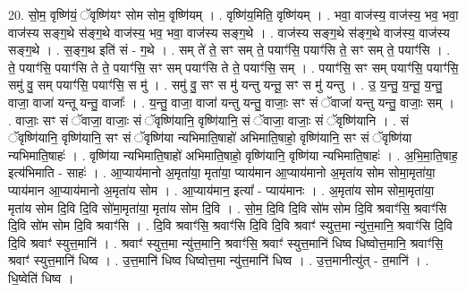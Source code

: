 \documentclass[17pt]{extarticle}
\begin{document}
20. सो॒म॒ वृष्णि॑यं॒ ॅवृष्णि॑यꣳ सोम सोम॒ वृष्णि॑यम् । . वृष्णि॑य॒मिति॒ वृष्णि॑यम् । . भवा॒ वाज॑स्य॒ वाज॑स्य॒ भव॒ भवा॒ वाज॑स्य सङ्ग॒थे स॑ङ्ग॒थे वाज॑स्य॒ भव॒ भवा॒ वाज॑स्य सङ्ग॒थे । . वाज॑स्य सङ्ग॒थे स॑ङ्ग॒थे वाज॑स्य॒ वाज॑स्य सङ्ग॒थे । . स॒ङ्ग॒थ इति॑ सं - ग॒थे । . सम् ते॑ ते॒ सꣳ सम् ते॒ पयाꣳ॑सि॒ पयाꣳ॑सि ते॒ सꣳ सम् ते॒ पयाꣳ॑सि । . ते॒ पयाꣳ॑सि॒ पयाꣳ॑सि ते ते॒ पयाꣳ॑सि॒ सꣳ सम् पयाꣳ॑सि ते ते॒ पयाꣳ॑सि॒ सम् । . पयाꣳ॑सि॒ सꣳ सम् पयाꣳ॑सि॒ पयाꣳ॑सि॒ समु॑ वु॒ सम् पयाꣳ॑सि॒ पयाꣳ॑सि॒ स मु॑ । . समु॑ वु॒ सꣳ स मु॑ यन्तु यन्तू॒ सꣳ स मु॑ यन्तु । . उ॒ य॒न्तु॒ य॒न्तू॒ य॒न्तु॒ वाजा॒ वाजा॑ यन्तू यन्तु॒ वाजाः᳚ । . य॒न्तु॒ वाजा॒ वाजा॑ यन्तु यन्तु॒ वाजाः॒ सꣳ सं ॅवाजा॑ यन्तु यन्तु॒ वाजाः॒ सम् । . वाजाः॒ सꣳ सं ॅवाजा॒ वाजाः॒ सं ॅवृष्णि॑यानि॒ वृष्णि॑यानि॒ सं ॅवाजा॒ वाजाः॒ सं ॅवृष्णि॑यानि । . सं ॅवृष्णि॑यानि॒ वृष्णि॑यानि॒ सꣳ सं ॅवृष्णि॑या न्यभिमाति॒षाहो॑ अभिमाति॒षाहो॒ वृष्णि॑यानि॒ सꣳ सं ॅवृष्णि॑या न्यभिमाति॒षाहः॑ । . वृष्णि॑या न्यभिमाति॒षाहो॑ अभिमाति॒षाहो॒ वृष्णि॑यानि॒ वृष्णि॑या न्यभिमाति॒षाहः॑ । . अ॒भि॒मा॒ति॒षाह॒ इत्य॑भिमाति - साहः॑ । . आ॒प्याय॑मानो अ॒मृता॑या॒ मृता॑या॒ प्याय॑मान आ॒प्याय॑मानो अ॒मृता॑य सोम सोमा॒मृता॑या॒ प्याय॑मान आ॒प्याय॑मानो अ॒मृता॑य सोम । . आ॒प्याय॑मान॒ इत्या᳚ - प्याय॑मानः । . अ॒मृता॑य सोम सोमा॒मृता॑या॒ मृता॑य सोम दि॒वि दि॒वि सो॑मा॒मृता॑या॒ मृता॑य सोम दि॒वि । . सो॒म॒ दि॒वि दि॒वि सो॑म सोम दि॒वि श्रवाꣳ॑सि॒ श्रवाꣳ॑सि दि॒वि सो॑म सोम दि॒वि श्रवाꣳ॑सि । . दि॒वि श्रवाꣳ॑सि॒ श्रवाꣳ॑सि दि॒वि दि॒वि श्रवाꣳ॑ स्युत्त॒मा न्यु॑त्त॒मानि॒ श्रवाꣳ॑सि दि॒वि दि॒वि श्रवाꣳ॑ स्युत्त॒मानि॑ । . श्रवाꣳ॑ स्युत्त॒मा न्यु॑त्त॒मानि॒ श्रवाꣳ॑सि॒ श्रवाꣳ॑ स्युत्त॒मानि॑ धिष्व धिष्वोत्त॒मानि॒ श्रवाꣳ॑सि॒ श्रवाꣳ॑ स्युत्त॒मानि॑ धिष्व । . उ॒त्त॒मानि॑ धिष्व धिष्वोत्त॒मा न्यु॑त्त॒मानि॑ धिष्व । . उ॒त्त॒मानीत्यु॑त् - त॒मानि॑ । . धि॒ष्वेति॑ धिष्व । \newline
\pagebreak
{}
\end{document}
